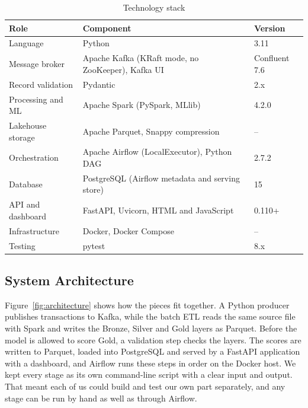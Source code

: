 \documentclass[11pt,a4paper]{article}
\begin{document}
\begin{table}[H]
\centering
\caption{Technology stack}
\label{tab:stack}
\begin{tabularx}{\linewidth}{lLl}
\toprule
Role & Component & Version \\
\midrule
Language & Python & 3.11 \\
Message broker & Apache Kafka (KRaft mode, no ZooKeeper), Kafka UI & Confluent 7.6 \\
Record validation & Pydantic & 2.x \\
Processing and ML & Apache Spark (PySpark, MLlib) & 4.2.0 \\
Lakehouse storage & Apache Parquet, Snappy compression & -- \\
Orchestration & Apache Airflow (LocalExecutor), Python DAG & 2.7.2 \\
Database & PostgreSQL (Airflow metadata and serving store) & 15 \\
API and dashboard & FastAPI, Uvicorn, HTML and JavaScript & 0.110+ \\
Infrastructure & Docker, Docker Compose & -- \\
Testing & pytest & 8.x \\
\bottomrule
\end{tabularx}
\end{table}

\subsection{System Architecture}
Figure~\ref{fig:architecture} shows how the pieces fit together. A Python
producer publishes transactions to Kafka, while the batch ETL reads the same
source file with Spark and writes the Bronze, Silver and Gold layers as Parquet.
Before the model is allowed to score Gold, a validation step checks the layers.
The scores are written to Parquet, loaded into PostgreSQL and served by a FastAPI
application with a dashboard, and Airflow runs these steps in order on the Docker
host. We kept every stage as its own command-line script with a clear input and
output. That meant each of us could build and test our own part separately, and
any stage can be run by hand as well as through Airflow.
\end{document}
